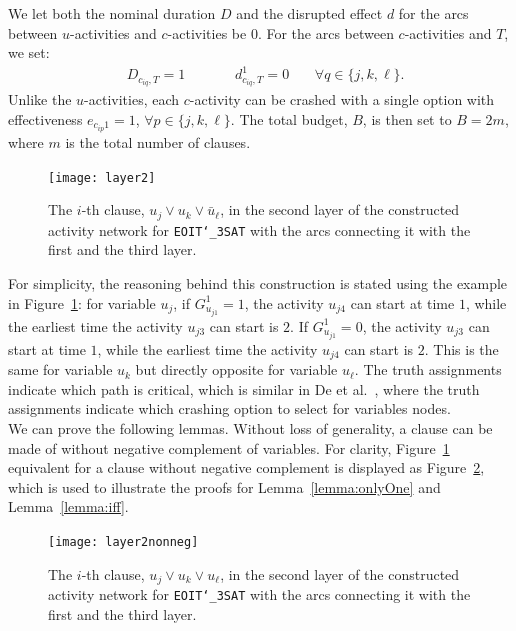 \documentclass[11pt]{article}
\newcommand{\noi}{\noindent}
\begin{document}
		\newline
		We let both the nominal duration \(D\) and the disrupted effect \(d\) for the arcs between \(u\)-activities and \(c\)-activities be \(0\). For the arcs between \(c\)-activities and \(T\), we set:
		\begin{align*}
		& D_{c_{iq},T} = 1 \qquad \quad \;\; d^1_{c_{iq},T} = 0 \;\;\;\quad \forall q \in \{j,k,\ell\}.
		\end{align*}
		Unlike the \(u\)-activities, each \(c\)-activity can be crashed with a single option with effectiveness \(e_{c_{ip}1} = 1\), \(\forall p \in \{j,k,\ell\}\). The total budget, \(B\), is then set to \(B = 2m\), where \(m\) is the total number of clauses.
		\begin{figure}[H]
			\centering
			\texttt{[image: layer2]}
			\caption{The \(i\)-th clause, \(u_{j} \vee u_{k} \vee \bar{u}_{\ell}\), in the second layer of the constructed activity network for \texttt{EOIT\char`_3SAT} with the arcs connecting it with the first and the third layer.}
			\label{fig:layer2}
		\end{figure}
		\noi For simplicity, the reasoning behind this construction is stated using the example in Figure~\ref{fig:layer2}: for variable \(u_j\), if \(G^1_{u_{j1}} = 1\), the activity \(u_{j4}\) can start at time \(1\), while the earliest time the activity \(u_{j3}\) can start is \(2\). If \(G^1_{u_{j1}} = 0\), the activity \(u_{j3}\) can start at time \(1\), while the earliest time the activity \(u_{j4}\) can start is \(2\). This is the same for variable \(u_k\) but directly opposite for variable \(u_\ell\). The truth assignments indicate which path is critical, which is similar in De et al.~\cite{de1997complexity}, where the truth assignments indicate which crashing option to select for variables nodes. \\
		\newline
		We can prove the following lemmas. Without loss of generality, a clause can be made of without negative complement of variables. For clarity, Figure~\ref{fig:layer2} equivalent for a clause without negative complement is displayed as Figure~\ref{fig:layer2nonneg}, which is used to illustrate the proofs for Lemma~\ref{lemma:onlyOne} and Lemma~\ref{lemma:iff}.
		\begin{figure}[H]
			\centering
			\texttt{[image: layer2nonneg]}
			\caption{The \(i\)-th clause, \(u_{j} \vee u_{k} \vee u_{\ell}\), in the second layer of the constructed activity network for \texttt{EOIT\char`_3SAT} with the arcs connecting it with the first and the third layer.}
			\label{fig:layer2nonneg}
		\end{figure}
\end{document}
